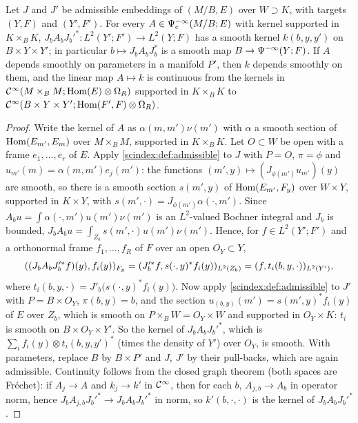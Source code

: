 \begin{lemma}\label{scindex:lem:mixed}
  Let $J$ and $J'$ be admissible embeddings of $(M/B,E)$ over $W\supset K$, with
  targets $(Y,F)$ and $(Y',F')$. For every $A\in\Psi^{-\infty}_{\mathrm c}
  (M/B;E)$ with kernel supported in $K\times_BK$, $J_bA_bJ_b'^*:L^2(Y';F')\to
  L^2(Y;F)$ has a smooth kernel $k(b,y,y')$ on $B\times Y\times Y'$; in
  particular $b\mapsto J_bA_bJ_b^*$ is a smooth map $B\to\Psi^{-\infty}(Y;F)$.
  If $A$ depends smoothly on parameters in a manifold $P'$, then $k$ depends
  smoothly on them, and the linear map $A\mapsto k$ is continuous from the
  kernels in $\mathcal{C}^\infty(M\times_BM;\operatorname{Hom}(E)\otimes\Omega_R)$ supported in $K\times_BK$
  to $\mathcal{C}^\infty(B\times Y\times Y';\operatorname{Hom}(F',F)\otimes\Omega_R)$.
\end{lemma}
\begin{proof}
  Write the kernel of $A$ as $\alpha(m,m')\nu(m')$ with $\alpha$ a smooth
  section of $\operatorname{Hom}(E_{m'},E_m)$ over $M\times_BM$, supported in $K\times_BK$.
  Let $O\subset W$ be open with a frame $e_1,\dots,e_r$ of $E$. Apply
  \cref{scindex:def:admissible} to $J$ with $P=O$, $\pi=\phi$ and
  $u_{m'}(m)=\alpha(m,m')e_j(m')$: the functions $(m',y)\mapsto
  (J_{\phi(m')}u_{m'})(y)$ are smooth, so there is a smooth section $s(m',y)$ of
  $\operatorname{Hom}(E_{m'},F_y)$ over $W\times Y$, supported in $K\times Y$, with
  $s(m',\cdot)=J_{\phi(m')}\alpha(\cdot,m')$. Since $A_bu=\int\alpha(\cdot,m')
  u(m')\nu(m')$ is an $L^2$-valued Bochner integral and $J_b$ is bounded,
  $J_bA_bu=\int_{Z_b}s(m',\cdot)u(m')\nu(m')$. Hence, for $f\in L^2(Y';F')$ and a
  orthonormal frame $f_1,\dots,f_R$ of $F$ over an open $O_Y\subset Y$,
  \begin{equation*}
    ( (J_bA_bJ_b'^*f)(y), f_i(y))_{F_y}=( J_b'^*f, s(\cdot,y)^*f_i(y))
    _{L^2(Z_b)}=( f, t_i(b,y,\cdot))_{L^2(Y')},
  \end{equation*}
  where $t_i(b,y,\cdot)=J'_b\bigl(s(\cdot,y)^*f_i(y)\bigr)$. Now apply
  \cref{scindex:def:admissible} to $J'$ with $P=B\times O_Y$, $\pi(b,y)=b$, and
  the section $u_{(b,y)}(m')=s(m',y)^*f_i(y)$ of $E$ over $Z_b$, which is smooth
  on $P\times_BW=O_Y\times W$ and supported in $O_Y\times K$: $t_i$ is smooth on
  $B\times O_Y\times Y'$. So the kernel of $J_bA_bJ_b'^*$, which is
  $\sum_if_i(y)\otimes t_i(b,y,y')^*$ (times the density of $Y'$) over $O_Y$, is
  smooth. With
  parameters, replace $B$ by $B\times P'$ and $J$, $J'$ by their pull-backs, which
  are again admissible. Continuity follows from the closed graph theorem (both
  spaces are Fréchet): if $A_j\to A$ and $k_j\to k'$ in $\mathcal{C}^\infty$, then for each $b$,
  $A_{j,b}\to A_b$ in operator norm, hence $J_bA_{j,b}J_b'^*\to J_bA_bJ_b'^*$ in
  norm, so $k'(b,\cdot,\cdot)$ is the kernel of $J_bA_bJ_b'^*$.
\end{proof}

